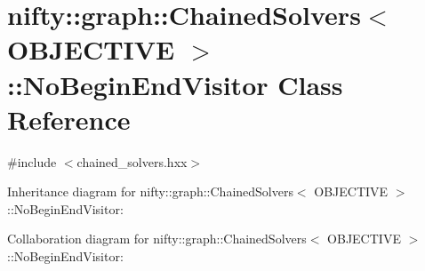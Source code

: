 \hypertarget{classnifty_1_1graph_1_1ChainedSolvers_1_1NoBeginEndVisitor}{}\section{nifty\+:\+:graph\+:\+:Chained\+Solvers$<$ O\+B\+J\+E\+C\+T\+I\+V\+E $>$\+:\+:No\+Begin\+End\+Visitor Class Reference}
\label{classnifty_1_1graph_1_1ChainedSolvers_1_1NoBeginEndVisitor}


{\ttfamily \#include $<$chained\+\_\+solvers.\+hxx$>$}



Inheritance diagram for nifty\+:\+:graph\+:\+:Chained\+Solvers$<$ O\+B\+J\+E\+C\+T\+I\+V\+E $>$\+:\+:No\+Begin\+End\+Visitor\+:


Collaboration diagram for nifty\+:\+:graph\+:\+:Chained\+Solvers$<$ O\+B\+J\+E\+C\+T\+I\+V\+E $>$\+:\+:No\+Begin\+End\+Visitor\+:
